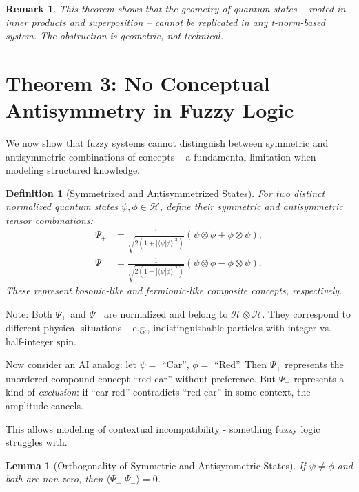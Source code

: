 \documentclass{article}
\newtheorem{lemma}[theorem]{Lemma}
\newtheorem{definition}[theorem]{Definition}
\newtheorem{remark}[theorem]{Remark}
\begin{document}
\begin{remark}
This theorem shows that the geometry of quantum states -- rooted in inner products and superposition -- cannot be replicated in any t-norm-based system. The obstruction is geometric, not technical.
\end{remark}

\section{Theorem 3: No Conceptual Antisymmetry in Fuzzy Logic}

We now show that fuzzy systems cannot distinguish between symmetric and antisymmetric combinations of concepts -- a fundamental limitation when modeling structured knowledge.

\begin{definition}[Symmetrized and Antisymmetrized States]
For two distinct normalized quantum states $\psi, \phi \in \mathcal{H}$, define their symmetric and antisymmetric tensor combinations:
\begin{align}
    \Psi_+ &= \frac{1}{\sqrt{2(1 + |\langle\psi|\phi\rangle|^2)}} \left( \psi \otimes \phi + \phi \otimes \psi \right), \\
    \Psi_- &= \frac{1}{\sqrt{2(1 - |\langle\psi|\phi\rangle|^2)}} \left( \psi \otimes \phi - \phi \otimes \psi \right).
\end{align}
These represent bosonic-like and fermionic-like composite concepts, respectively.
\end{definition}

Note: Both $\Psi_+$ and $\Psi_-$ are normalized and belong to $\mathcal{H} \otimes \mathcal{H}$. They correspond to different physical situations -- e.g., indistinguishable particles with integer vs. half-integer spin.

Now consider an AI analog:
let $\psi =$ ``Car'', $\phi =$ ``Red''.
Then $\Psi_+$ represents the unordered compound concept ``red car'' without preference.
But $\Psi_-$ represents a kind of \emph{exclusion}: if ``car-red'' contradicts ``red-car'' in some context, the amplitude cancels.

This allows modeling of contextual incompatibility - something fuzzy logic struggles with.

\begin{lemma}[Orthogonality of Symmetric and Antisymmetric States]
If $\psi \neq \phi$ and both are non-zero, then $\langle \Psi_+ | \Psi_- \rangle = 0$.
\end{lemma}
\end{document}
